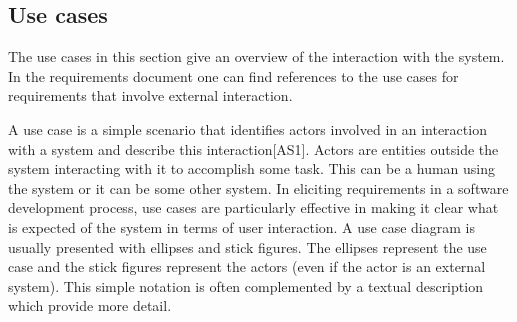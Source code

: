 \subsection{Use cases}
\label{subsec:use_cases}

The use cases in this section give an overview of the interaction with the system. In the requirements document one can find references to the use cases for requirements that involve external interaction.\newline

A use case is a simple scenario that identifies actors involved in an interaction with a system and describe this interaction[AS1]. Actors are entities outside the system interacting with it to accomplish some task. This can be a human using the system or it can be some other system. In eliciting requirements in a software development process, use cases are particularly effective in making it clear what is expected of the system in terms of user interaction. A use case diagram is usually presented with ellipses and stick figures. The ellipses represent the use case and the stick figures represent the actors (even if the actor is an external system). This simple notation is often complemented by a textual description which provide more detail.\newline

